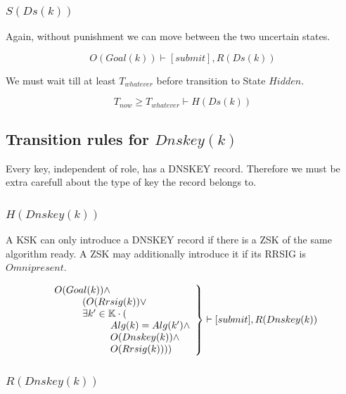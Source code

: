 \documentclass[twoside,english, a4paper]{article}
\newcommand{\mathbox}[1]{#1}
\begin{document}
\subsubsection{$S(Ds(k))$}

\mathbox{

	Again, without punishment we can move between the two uncertain 
	states.

	\begin{equation}
			O(Goal(k)) \vdash [submit], R(Ds(k)) 
	\end{equation}

	We must wait till at least $T_{whatever}$ before transition to State 
	$Hidden$.
	
	\begin{equation}
			T_{now} \geq T_{whatever} \vdash H(Ds(k))
	\end{equation}
}


\subsection{Transition rules for $Dnskey(k)$}

Every key, independent of role, has a DNSKEY record. Therefore we must
be extra carefull about the type of key the record belongs to.

\subsubsection{$H(Dnskey(k))$}

\mathbox{

	A KSK can only introduce a DNSKEY record if there is a ZSK of the
	same algorithm ready. A ZSK may additionally introduce it if its 
	RRSIG is $Omnipresent$.

	\begin{equation}
		\left.
		\begin{array}{l}
			O(Goal(k)) \wedge \\
\hskip 1cm	(O(Rrsig(k)) \vee \\
\hskip 1cm	\exists k' \in \mathbb{K} \cdot ( \\
\hskip 2cm		Alg(k)=Alg(k') \wedge \\
\hskip 2cm		O(Dnskey(k)) \wedge \\
\hskip 2cm		O(Rrsig(k))))\\
		\end{array}
		\right\} \vdash [submit], R(Dnskey(k))
	\end{equation}
}

\subsubsection{$R(Dnskey(k))$}
\end{document}
